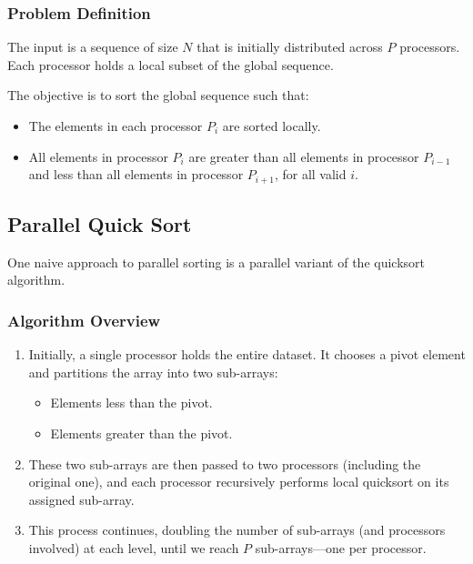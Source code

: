 \documentclass[12pt]{book}
\begin{document}
\subsubsection*{Problem Definition}

The input is a sequence of size $N$ that is initially distributed across $P$ processors. Each processor holds a local subset of the global sequence.

The objective is to sort the global sequence such that:
\begin{itemize}
    \item The elements in each processor $P_i$ are sorted locally.
    \item All elements in processor $P_i$ are greater than all elements in processor $P_{i-1}$ and less than all elements in processor $P_{i+1}$, for all valid $i$.
\end{itemize}

\subsection{Parallel Quick Sort}

One naive approach to parallel sorting is a parallel variant of the quicksort algorithm.

\subsubsection*{Algorithm Overview}

\begin{enumerate}
    \item Initially, a single processor holds the entire dataset. It chooses a pivot element and partitions the array into two sub-arrays:
    \begin{itemize}
        \item Elements less than the pivot.
        \item Elements greater than the pivot.
    \end{itemize}
    
    \item These two sub-arrays are then passed to two processors (including the original one), and each processor recursively performs local quicksort on its assigned sub-array.

    \item This process continues, doubling the number of sub-arrays (and processors involved) at each level, until we reach $P$ sub-arrays—one per processor.
\end{enumerate}
\end{document}
